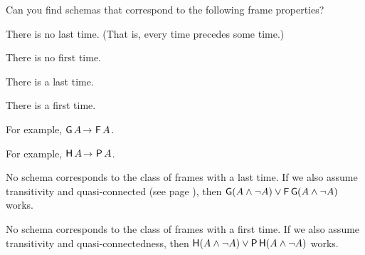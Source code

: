

\begin{exercise}
  Can you find schemas that correspond to the following frame properties?
  \begin{exlist}
  \item There is no last time. (That is, every time precedes some time.)
  \item There is no first time. 
  \item There is a last time.
  \item There is a first time.
  \end{exlist}
\vspace{-2mm}
\end{exercise}
\begin{solution}
  \begin{sollist}
    \item For example, $\tG A \to \tF A$.
  \item For example, $\tH A \to \tP A$.
  \item No schema corresponds to the class of frames with a last time. If we
  also assume transitivity and quasi-connected (see page
  \pageref{quasiconnected}), then
  $\operatorname{\mathsf{G}}(A \land \neg A) \lor \operatorname{\mathsf{F}}\operatorname{\mathsf{G}}(A \land \neg A)$ works.
  \item No schema corresponds to the class of frames with a first time. If we
    also assume transitivity and quasi-connectedness, then
    $\operatorname{\mathsf{H}}(A \land \neg A) \lor \operatorname{\mathsf{P}}\operatorname{\mathsf{H}}(A \land \neg A)$ works.
  \end{sollist}
\end{solution}
\vspace{-2mm}

